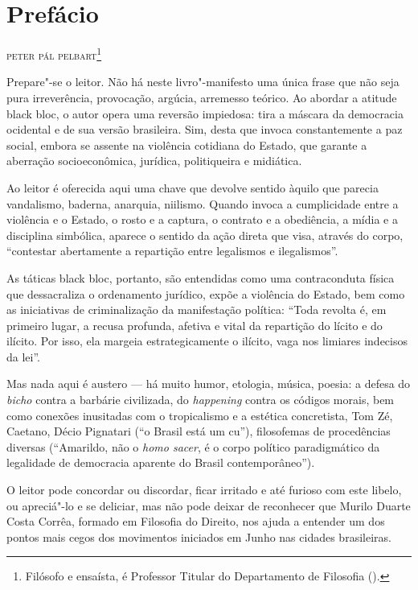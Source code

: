 \chapter*{Prefácio}

\begin{flushright}
\textsc{peter pál pelbart}\footnote{Filósofo e ensaísta, é
Professor Titular do Departamento de Filosofia ().}
\end{flushright}

Prepare"-se o leitor. Não há neste livro"-manifesto uma única frase que
não seja pura irreverência, provocação, argúcia, arremesso teórico. Ao
abordar a atitude black bloc, o autor opera uma reversão
impiedosa: tira a máscara da democracia ocidental e de sua versão
brasileira. Sim, desta que invoca constantemente a paz social, embora se
assente na violência cotidiana do Estado, que garante a aberração
socioeconômica, jurídica, politiqueira e midiática.

Ao leitor é oferecida aqui uma chave que devolve sentido àquilo que
parecia vandalismo, baderna, anarquia, niilismo. Quando invoca a
cumplicidade entre a violência e o Estado, o rosto e a captura, o
contrato e a obediência, a mídia e a disciplina simbólica, aparece o
sentido da ação direta que visa, através do corpo, ``contestar
abertamente a repartição entre legalismos e ilegalismos''.

As táticas black bloc, portanto, são entendidas como uma
contraconduta física que dessacraliza o ordenamento jurídico, expõe a
violência do Estado, bem como as iniciativas de criminalização da
manifestação política: ``Toda revolta é, em primeiro lugar, a recusa
profunda, afetiva e vital da repartição do lícito e do ilícito. Por
isso, ela margeia estrategicamente o ilícito, vaga nos limiares
indecisos da lei''.

Mas nada aqui é austero --- há muito humor, etologia, música, poesia: a
defesa do \emph{bicho} contra a barbárie civilizada, do \emph{happening}
contra os códigos morais, bem como conexões inusitadas com o
tropicalismo e a estética concretista, Tom Zé, Caetano, Décio Pignatari
(``o Brasil está um cu''), filosofemas de procedências diversas
(``Amarildo, não o \emph{homo sacer}, é o corpo político paradigmático
da legalidade de democracia aparente do Brasil contemporâneo'').

O leitor pode concordar ou discordar, ficar irritado e até furioso com
este libelo, ou apreciá"-lo e se deliciar, mas não pode deixar de
reconhecer que Murilo Duarte Costa Corrêa, formado em Filosofia do
Direito, nos ajuda a entender um dos pontos mais cegos dos movimentos
iniciados em Junho nas cidades brasileiras.


